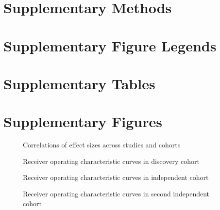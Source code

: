 \documentclass[11pt,letterpaper]{article}
\makeatletter
\renewcommand{\maketitle}{
        \begingroup
            \setlength{\parindent}{0pt}
            \begin{flushleft}
                \LARGE\textbf{\@title}
                \newline
                \newline
                \small\@author
            \end{flushleft}
        \endgroup
    }
\makeatother
\begin{document}
\maketitle

\newpage
\section*{Supplementary Methods}


\newpage



\newpage
\section*{Supplementary Figure Legends}


\newpage
\section*{Supplementary Tables}



\FloatBarrier
\newpage
\section*{Supplementary Figures}

\begin{figure}[ht]
  \caption{Correlations of effect sizes across studies and cohorts}
  \label{fig:corrs}
\end{figure}

\begin{figure}[ht]
  \caption{Receiver operating characteristic curves in discovery cohort}
  \label{fig:rocA}
\end{figure}

\begin{figure}[ht]
  \caption{Receiver operating characteristic curves in independent cohort}
  \label{fig:rocC}
\end{figure}

\begin{figure}[ht]
  \caption{Receiver operating characteristic curves in second independent cohort}
  \label{fig:rocB}
\end{figure}
\end{document}
